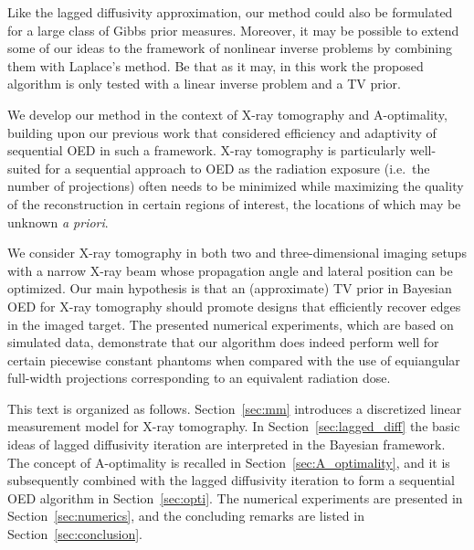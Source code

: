 \documentclass[final]{siamltex}
\begin{document}
Like the lagged diffusivity approximation, our method could also be formulated for a large class of Gibbs prior measures. Moreover, it may be possible to extend some of our ideas to the framework of nonlinear inverse problems by combining them with Laplace's method. Be that as it may, in this work the proposed algorithm is only tested with a linear inverse problem and a TV prior.

We develop our method in the context of X-ray tomography and A-optimality, building upon our previous work \cite{Burger21} that considered efficiency and adaptivity of sequential OED in such a framework. X-ray tomography is particularly well-suited for a sequential approach to OED as the radiation exposure (i.e.~the number of projections) often needs to be minimized while maximizing the quality of the reconstruction in certain regions of interest, the locations of which may be unknown {\em a priori}.

We consider X-ray tomography in both two and three-dimensional imaging setups with a narrow X-ray beam whose propagation angle and lateral position can be optimized. Our main hypothesis is that an (approximate) TV prior in Bayesian OED for X-ray tomography should promote designs that efficiently recover edges in the imaged target. The presented numerical experiments, which are based on simulated data, demonstrate that our algorithm does indeed perform well for certain piecewise constant phantoms when compared with the use of equiangular full-width projections corresponding to an equivalent radiation dose.

This text is organized as follows. Section~\ref{sec:mm} introduces a discretized linear measurement model for X-ray tomography. In Section~\ref{sec:lagged_diff} the basic ideas of lagged diffusivity iteration are interpreted in the Bayesian framework. The concept of A-optimality is recalled in Section~\ref{sec:A_optimality}, and it is subsequently combined with the lagged diffusivity iteration to form a sequential OED algorithm in Section~\ref{sec:opti}. The numerical experiments are presented in Section~\ref{sec:numerics}, and the concluding remarks are listed in Section~\ref{sec:conclusion}.
\end{document}
